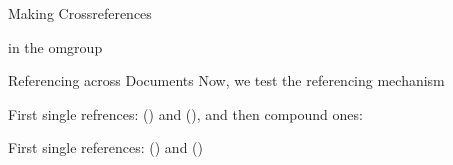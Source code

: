 \begin{omgroup}[id=mcr]{Making Crossreferences}
\begin{omtext} 
 in the omgroup 
\end{omtext} 
\end{omgroup} 
\newpage
\begin{omgroup}[id=rad]{Referencing across Documents}
Now, we test the referencing mechanism
\begin{omtext}[title=Internal Referencing]
  First single refrences:  () and  (),
  and then compound ones: 
\end{omtext}
 
\begin{omtext}[title=External Referencing]
  First single references:  () and
   ()
\end{omtext}
\end{omgroup} 
